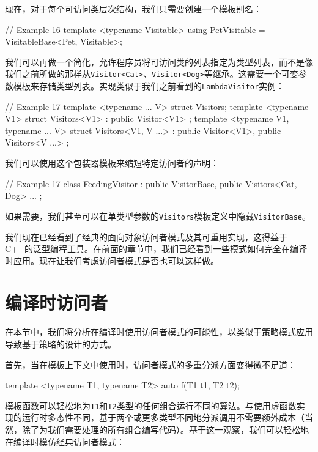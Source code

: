 \begin{code}
{现在，对于每个可访问类层次结构，我们只需要创建一个模板别名：

\begin{code}
// Example 16
template <typename Visitable>
using PetVisitable = VisitableBase<Pet, Visitable>;
\end{code}

我们可以再做一个简化，允许程序员将可访问类的列表指定为类型列表，而不是像我们之前所做的那样从\texttt{Visitor\textless{}Cat\textgreater{}}、\texttt{Visitor\textless{}Dog\textgreater{}}等继承。这需要一个可变参数模板来存储类型列表。实现类似于我们之前看到的\texttt{LambdaVisitor}实例：

\begin{code}
// Example 17
template <typename ... V> struct Visitors;
template <typename V1>
struct Visitors<V1> : public Visitor<V1> {};
template <typename V1, typename ... V>
struct Visitors<V1, V ...> : public Visitor<V1>,
                             public Visitors<V ...> {};
\end{code}

我们可以使用这个包装器模板来缩短特定访问者的声明：

\begin{code}
// Example 17
class FeedingVisitor :
  public VisitorBase, public Visitors<Cat, Dog>
{
  ...
};
\end{code}

如果需要，我们甚至可以在单类型参数的\texttt{Visitors}模板定义中隐藏\texttt{VisitorBase}。

我们现在已经看到了经典的面向对象访问者模式及其可重用实现，这得益于C++的泛型编程工具。在前面的章节中，我们已经看到一些模式如何完全在编译时应用。现在让我们考虑访问者模式是否也可以这样做。

\section{编译时访问者}

在本节中，我们将分析在编译时使用访问者模式的可能性，以类似于策略模式应用导致基于策略的设计的方式。

首先，当在模板上下文中使用时，访问者模式的多重分派方面变得微不足道：

\begin{code}
template <typename T1, typename T2> auto f(T1 t1, T2 t2);
\end{code}

模板函数可以轻松地为\texttt{T1}和\texttt{T2}类型的任何组合运行不同的算法。与使用虚函数实现的运行时多态性不同，基于两个或更多类型不同地分派调用不需要额外成本（当然，除了为我们需要处理的所有组合编写代码）。基于这一观察，我们可以轻松地在编译时模仿经典访问者模式：

}
\end{code}

